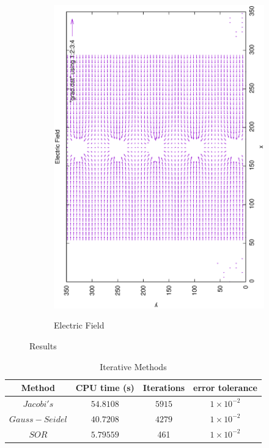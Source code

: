 \documentclass[a4paper]{article}
\begin{document}
{\begin{figure}[h!]
\begin{subfigure}{0.45\textwidth}
\includegraphics[scale=0.27, angle=-90]{grad}
\label{fig:grad}
\caption{Electric Field}
\end{subfigure}
\caption{Results}
\label{fig:results}
\end{figure}}


\begin{table}[h!]
\centering
\begin{tabular}{| c | c | c | c |}
\hline
Method & CPU time (s) & Iterations & error tolerance\\
\hline\hline
$Jacobi's$ & $54.8108$ & $5915$ & $1 \times 10^{-2}$\\
\hline
$Gauss-Seidel$ & $40.7208$ & $4279$ & $1 \times 10^{-2}$\\
\hline
$SOR$ & $5.79559$ & 461 & $1 \times 10^{-2}$\\
\hline
\end{tabular}
\caption{Iterative Methods}
\label{table:methods}
\end{table}
\end{document}
